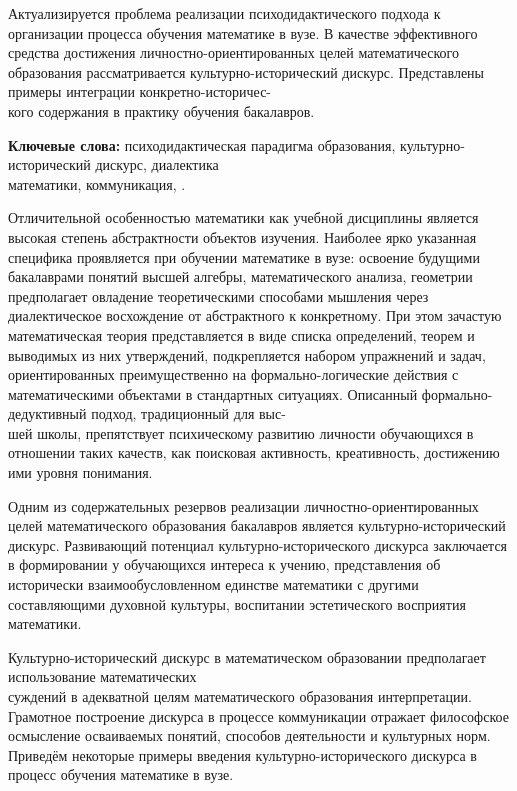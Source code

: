\vzmscaption




Актуализируется проблема реализации психодидактического подхода к организации процесса обучения математике в вузе. В качестве эффективного средства достижения личностно-ориентированных целей математического образования рассматривается культурно-исторический дискурс. Представлены примеры интеграции конкретно-историчес-\\кого содержания в практику обучения бакалавров.




{\bf Ключевые слова:} психодидактическая парадигма образования, культурно-исторический дискурс, диалектика \\математики, коммуника\-ция, .


Отличительной особенностью математики как учебной дисциплины является высокая степень абстрактности объектов изучения. Наиболее ярко указанная специфика проявляется при обучении математике в вузе: освоение будущими бакалаврами понятий высшей алгебры, математического анализа, геометрии предполагает овладение теоретическими способами мышления через диалектическое восхождение от абстрактного к конкретному. При этом зачастую математическая теория представляется в виде списка определений, теорем и выводимых из них утверждений, подкрепляется набором упражнений и задач, ориентированных преимущественно на формально-логические действия с математическими объектами в стандартных ситуациях. Описанный формально-дедуктивный подход, традиционный для выс-\\шей школы, препятствует психическому развитию личности обучающихся в отношении таких качеств, как поисковая активность, креативность, достижению ими уровня понимания.

Одним из содержательных резервов реализации лично\-стно-ориентированных целей математического образования бакалавров является культурно-исторический дискурс. Развивающий потенциал культурно-исторического дискурса заключается в формировании у обучающихся интереса к учению, представления об исторически взаимообусловленном единстве математики с другими составляющими духовной культуры, воспитании эстетического восприятия математики.

Культурно-исторический дискурс в математическом образовании предполагает использование математических \\суждений в адекватной целям математического образования интерпретации. Грамотное построение дискурса в процессе коммуникации отражает философское осмысление ос\-ваиваемых понятий, способов деятельности и культурных норм. Приведём некоторые примеры введения культурно-исторического дискурса в процесс обучения математике в вузе.

